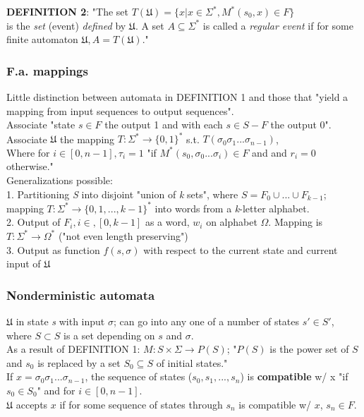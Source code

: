 \textbf{DEFINITION 2}: 
"The set $T(\mathfrak{U}) = \{ x | x \in \Sigma^{*}, M^{*}(s_0, x) \in F \}$ \\
is the \textit{set} (event) \textit{defined} by $\mathfrak{U}$. A set $A \subseteq \Sigma^{*}$ is called a \textit{regular event} if for some finite automaton $\mathfrak{U}, A = T(\mathfrak{U})$."

\subsubsection{F.a. mappings}
Little distinction between automata in DEFINITION 1 and those that "yield a mapping from input sequences to output sequences".\\
Associate "state $s \in F$ the output 1 and with each $s \in S - F$ the output 0".\\
Associate $\mathfrak{U}$ the mapping $T:\Sigma^{*} \to \{ 0, 1 \}^{*}$ s.t. $T(\sigma_{0} \sigma_{1}...\sigma_{n-1})$,\\
Where for $ i \in [0, n-1], \tau_i = 1$ "if $M^{*}(s_0, \sigma_0 ... \sigma_i) \in F$ and and $r_i = 0$ otherwise."\\
 \newpage
Generalizations possible:\\
1. Partitioning \textit{S} into disjoint "union of \textit{k} sets", where $S= F_0 \cup ... \cup F_{k-1}$; mapping $T:\Sigma^{*} \to { \{ 0, 1, ..., k-1 \} }^{*}$
into words from a \textit{k}-letter alphabet.\\
2. Output of $F_i, i \in,[0, k-1]$ as a word, $w_i$ on alphabet $\Omega$.  Mapping is $T:\Sigma^{*} \to \Omega^{*}$ ("not even length preserving")\\
3. Output as function $f(s, \sigma)$ with respect to the current state and current input of $\mathfrak{U}$

\subsubsection{Nonderministic automata}
$\mathfrak{U}$ in state \textit{s} with input $\sigma$; can go into any one of a number of states $s' \in S'$, where $S \subset S$ is a set depending on $s$ and $\sigma$.\\
As a result of DEFINITION 1: $M: S \times \Sigma \to P(S)$; "$P(S)$ is the power set of $S$ and $s_0$ is replaced by a set $S_0 \subseteq S$ of initial states."\\
If $x=\sigma_0 \sigma_1 ... \sigma_{n-1}$, the sequence of states ($s_0, s_1, ..., s_n$) is \textbf{compatible} w/ x "if $s_0 \in S_0$" and for $i \in [0, n-1]$.\\
$\mathfrak{U}$ accepts $x$ if for some sequence of states through $s_n$ is compatible w/ $x$, $s_n \in F$.

